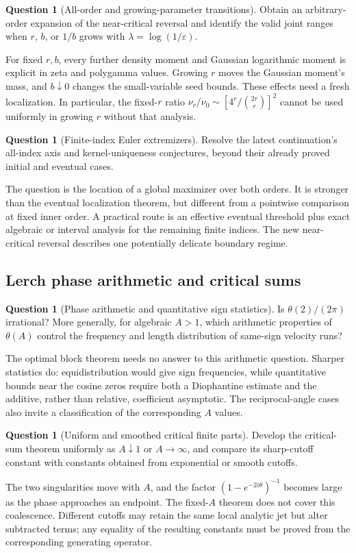 \documentclass[11pt,a4paper]{article}
\numberwithin{equation}{section}
\theoremstyle{definition}
\newtheorem{question}[theorem]{Question}
\theoremstyle{remark}
\begin{document}
\begin{question}[All-order and growing-parameter transitions]
Obtain an arbitrary-order expansion of the near-critical reversal
and identify the valid joint ranges when $r$, $b$, or $1/b$ grows
with $\lambda=\log(1/\varepsilon)$.
\end{question}
For fixed $r,b$, every further density moment and Gaussian logarithmic
moment is explicit in zeta and polygamma values. Growing $r$ moves the
Gaussian moment's mass, and $b\downarrow0$ changes the small-variable
seed bounds. These effects need a fresh localization. In particular,
the fixed-$r$ ratio $\nu_r/\nu_0\sim
[4^r/\binom{2r}{r}]^2$ cannot be used uniformly in growing $r$
without that analysis.

\begin{question}[Finite-index Euler extremizers]
Resolve the latest continuation's all-index axis and kernel-uniqueness
conjectures, beyond their already proved initial and eventual cases.
\end{question}
The question is the location of a global maximizer over both orders.
It is stronger than the eventual localization theorem, but different
from a pointwise comparison at fixed inner order. A practical route is
an effective eventual threshold plus exact algebraic or interval
analysis for the remaining finite indices. The new near-critical
reversal describes one potentially delicate boundary regime.

\subsection{Lerch phase arithmetic and critical sums}

\begin{question}[Phase arithmetic and quantitative sign statistics]
Is $\theta(2)/(2\pi)$ irrational? More generally, for algebraic $A>1$,
which arithmetic properties of $\theta(A)$ control the frequency and
length distribution of same-sign velocity runs?
\end{question}
The optimal block theorem needs no answer to this arithmetic question.
Sharper statistics do: equidistribution would give sign frequencies,
while quantitative bounds near the cosine zeros require both a
Diophantine estimate and the additive, rather than relative, coefficient
asymptotic. The reciprocal-angle cases also invite a classification of
the corresponding $A$ values.

\begin{question}[Uniform and smoothed critical finite parts]
Develop the critical-sum theorem uniformly as $A\downarrow1$ or
$A\to\infty$, and compare its sharp-cutoff constant with constants
obtained from exponential or smooth cutoffs.
\end{question}
The two singularities move with $A$, and the factor
$(1-e^{-2i\theta})^{-1}$ becomes large as the phase approaches an
endpoint. The fixed-$A$ theorem does not cover this coalescence.
Different cutoffs may retain the same local analytic jet but alter
subtracted terms; any equality of the resulting constants must be
proved from the corresponding generating operator.
\end{document}
